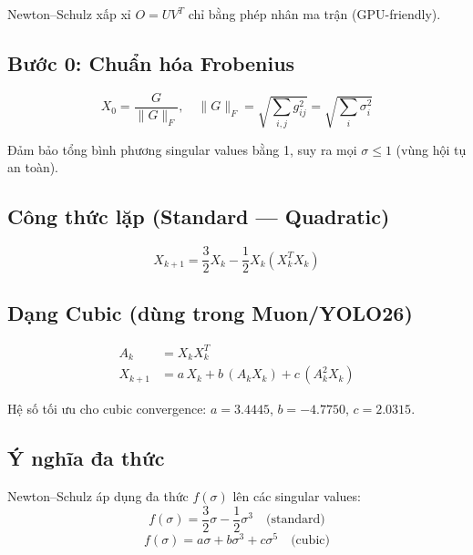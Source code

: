 Newton--Schulz xấp xỉ $O = UV^T$ chỉ bằng phép nhân ma trận (GPU-friendly).

\subsection{Bước 0: Chuẩn hóa Frobenius}

\begin{equation}
    X_0 = \frac{G}{\|G\|_F}, \quad \|G\|_F = \sqrt{\sum_{i,j} g_{ij}^2} = \sqrt{\sum_i \sigma_i^2}
\end{equation}

Đảm bảo tổng bình phương singular values bằng 1, suy ra mọi $\sigma \leq 1$ (vùng hội tụ an toàn).

\subsection{Công thức lặp (Standard --- Quadratic)}

\begin{equation}
    X_{k+1} = \frac{3}{2} X_k - \frac{1}{2} X_k (X_k^T X_k)
    \label{eq:ns_standard}
\end{equation}

\subsection{Dạng Cubic (dùng trong Muon/YOLO26)}

\begin{align}
    A_k &= X_k X_k^T \\
    X_{k+1} &= a \, X_k + b \, (A_k X_k) + c \, (A_k^2 X_k)
    \label{eq:ns_cubic}
\end{align}

Hệ số tối ưu cho cubic convergence: $a = 3.4445$, $b = -4.7750$, $c = 2.0315$.

\subsection{Ý nghĩa đa thức}

Newton--Schulz áp dụng đa thức $f(\sigma)$ lên các singular values:
\begin{equation}
    f(\sigma) = \frac{3}{2}\sigma - \frac{1}{2}\sigma^3 \quad \text{(standard)}
\end{equation}
\begin{equation}
    f(\sigma) = a\sigma + b\sigma^3 + c\sigma^5 \quad \text{(cubic)}
\end{equation}

